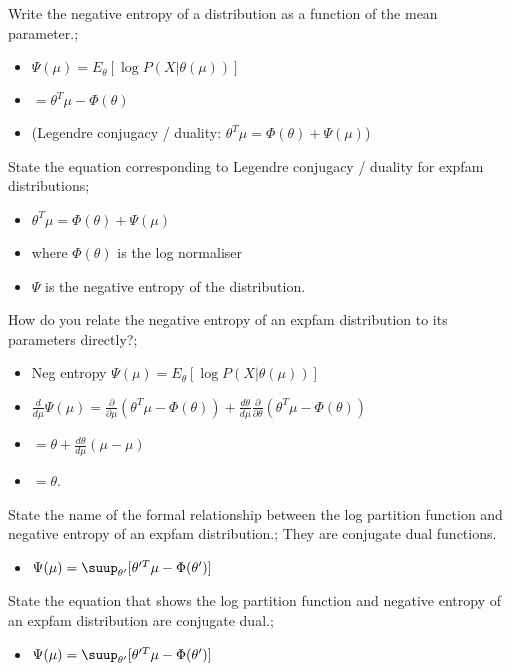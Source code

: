 \documentclass{article}
\begin{document}
Write the negative entropy of a distribution as a function of the mean parameter.; \begin{itemize}
    \item $\Psi(\mu) = E_{\theta}[\log P(X|\theta(\mu))]$
    \item $= \theta^T\mu - \Phi(\theta)$
    \item (Legendre conjugacy / duality: $\theta^T\mu = \Phi(\theta) + \Psi(\mu)$)
\end{itemize}

State the equation corresponding to Legendre conjugacy / duality for expfam distributions; \begin{itemize}
    \item $\theta^T\mu = \Phi(\theta) + \Psi(\mu)$
    \item where $\Phi(\theta)$ is the log normaliser
    \item $\Psi$ is the negative entropy of the distribution.
\end{itemize}

How do you relate the negative entropy of an expfam distribution to its parameters directly?; \begin{itemize}
    \item Neg entropy $\Psi(\mu) = E_{\theta}[\log P(X|\theta(\mu))]$
    \item $\frac{d}{d\mu}\Psi(\mu) = \frac{\partial}{\partial\mu}(\theta^T\mu - \Phi(\theta)) + \frac{d\theta}{d\mu}\frac{\partial}{\partial\theta}(\theta^T\mu - \Phi(\theta))$
    \item $= \theta + \frac{d\theta}{d\mu}(\mu - \mu )$
    \item $=\theta$.
\end{itemize}

State the name of the formal relationship between the log partition function and negative entropy of an expfam distribution.; They are conjugate dual functions. \begin{itemize}
    \item $\Psi(\mu) = \suup_{\theta'}[\theta'^T\mu - \Phi(\theta')]$
\end{itemize}

State the equation that shows the log partition function and negative entropy of an expfam distribution are conjugate dual.; \begin{itemize}
    \item $\Psi(\mu) = \suup_{\theta'}[\theta'^T\mu - \Phi(\theta')]$
\end{itemize}
\end{document}
